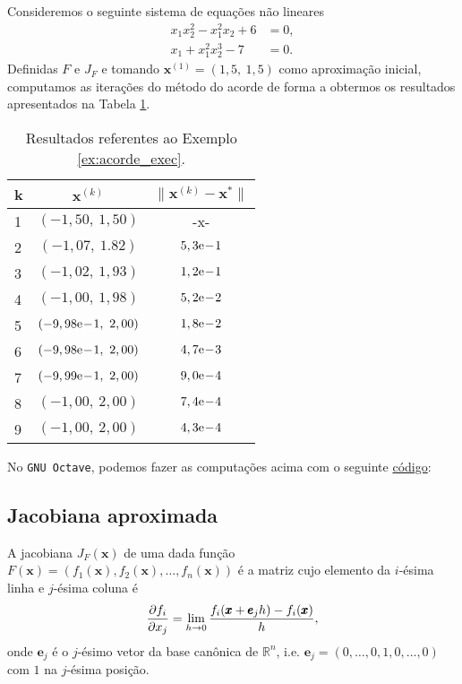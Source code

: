 \begin{ex}\label{ex:acorde_exec}
  Consideremos o seguinte sistema de equações não lineares
  \begin{align}
    x_1x_2^2 - x_1^2x_2 + 6 &= 0,\\
    x_1 + x_1^2x_2^3 - 7 &= 0.
  \end{align}
  Definidas $F$ e $J_F$ e tomando $\pmb{x}^{(1)} = (1,5,~1,5)$ como aproximação inicial, computamos as iterações do método do acorde de forma a obtermos os resultados apresentados na Tabela \ref{tab:ex_acorde_exec}.

  \begin{table}[h!]
    \centering
    \begin{tabular}{lcc}
      k & $\pmb{x}^{(k)}$ & $\|\pmb{x}^{(k)} - \pmb{x}^*\|$\\\hline
      1 & $(-1,50,~1,50)$ & -x- \\
      2 & $(-1,07,~1.82)$ & $5,3\mathrm{e}\!-\!1$ \\
      3 & $(-1,02,~1,93)$ & $1,2\mathrm{e}\!-\!1$ \\
      4 & $(-1,00,~1,98)$ & $5,2\mathrm{e}\!-\!2$ \\
      5 & $(-9,98\mathrm{e}\!-\!1,~2,00)$ & $1,8\mathrm{e}\!-\!2$ \\
      6 & $(-9,98\mathrm{e}\!-\!1,~2,00)$ & $4,7\mathrm{e}\!-\!3$ \\
      7 & $(-9,99\mathrm{e}\!-\!1,~2,00)$ & $9,0\mathrm{e}\!-\!4$ \\
      8 & $(-1,00,~2,00)$ & $7,4\mathrm{e}\!-\!4$ \\
      9 & $(-1,00,~2,00)$ & $4,3\mathrm{e}\!-\!4$ \\\hline
    \end{tabular}
    \caption{Resultados referentes ao Exemplo \ref{ex:acorde_exec}.}
    \label{tab:ex_acorde_exec}
  \end{table}

\ifisoctave
No \verb+GNU Octave+, podemos fazer as computações acima com o seguinte \href{https://github.com/phkonzen/notas/blob/master/src/MatematicaNumerica/cap_snl/dados/ex_acorde_exec/ex_acorde_exec.m}{código}:

\fi
\end{ex}

\subsection{Jacobiana aproximada}

A jacobiana $J_F(\pmb{x})$ de uma dada função $F(\pmb{x}) = (f_1(\pmb{x}), f_2(\pmb{x}), \dotsc, f_n(\pmb{x}))$ é a matriz cujo elemento da $i$-ésima linha e $j$-ésima coluna é
\begin{equation}
  \frac{\partial f_i}{\partial x_j} = \lim_{h\to 0} \frac{f_i(\pmb{x}+\pmb{e}_jh) - f_i(\pmb{x})}{h},
\end{equation}
onde $\pmb{e}_j$ é o $j$-ésimo vetor da base canônica de $\mathbb{R}^n$, i.e. $\pmb{e}_j = (0, \dotsc, 0, 1, 0, \dotsc, 0)$ com $1$ na $j$-ésima posição.

